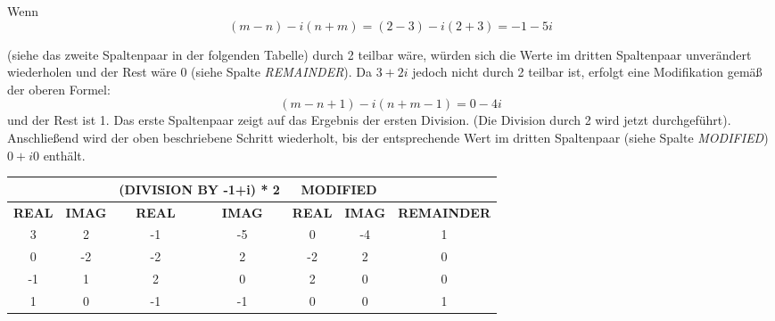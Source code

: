 \documentclass[course=erap]{aspdoc}
\begin{document}
    Wenn
    \[(m - n) - i(n+m)=(2-3) - i(2 + 3) = -1 - 5i\]

    (siehe das zweite Spaltenpaar in der folgenden Tabelle) durch 2 teilbar wäre, würden sich die Werte im dritten Spaltenpaar unverändert wiederholen und der Rest wäre 0 (siehe Spalte \textit{REMAINDER}). Da $3 + 2 i$ jedoch nicht durch 2 teilbar ist, erfolgt eine Modifikation gemäß der oberen Formel:
    \[(m - n + 1) - i(n + m - 1)= 0 - 4 i\]
    und der Rest ist 1.
    Das erste Spaltenpaar zeigt auf das Ergebnis der ersten Division.
    (Die Division durch 2 wird jetzt durchgeführt).
    Anschließend wird der oben beschriebene Schritt wiederholt, bis der entsprechende Wert im dritten Spaltenpaar (siehe Spalte \textit{MODIFIED}) $0 + i0$ enthält.
    \\

    \begin{table}[!ht]
        \centering
        \begin{tabular}{|c|c|cc|cc|c|}
            \hline
            & & \multicolumn{2}{c|}{\textbf{(DIVISION BY -1+i) * 2}} & \multicolumn{2}{c|}{\textbf{MODIFIED}}             &                  \\ \hline
            \textbf{REAL} & \textbf{IMAG} & \multicolumn{1}{c|}{\textbf{REAL}} & \textbf{IMAG} & \multicolumn{1}{c|}{\textbf{REAL}} & \textbf{IMAG} & \textbf{REMAINDER} \\ \hline
            3             & 2             & \multicolumn{1}{c|}{-1}            & -5            & \multicolumn{1}{c|}{0}             & -4            & 1                  \\ \hline
            0             & -2            & \multicolumn{1}{c|}{-2}            & 2             & \multicolumn{1}{c|}{-2}            & 2             & 0                  \\ \hline
            -1            & 1             & \multicolumn{1}{c|}{2}             & 0             & \multicolumn{1}{c|}{2}             & 0             & 0                  \\ \hline
            1             & 0             & \multicolumn{1}{c|}{-1}            & -1            & \multicolumn{1}{c|}{0}             & 0             & 1                  \\ \hline
        \end{tabular}
    \end{table}
\end{document}
